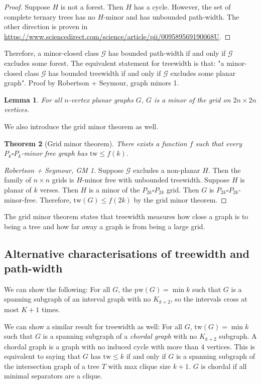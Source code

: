\documentclass[]{article}
\newcommand{\tw}{\text{tw}}
\newcommand{\pw}{\text{pw}}
\newtheorem{theorem}{Theorem}
\newtheorem{lemma}[theorem]{Lemma}
\theoremstyle{definition}
\numberwithin{theorem}{section}
\numberwithin{equation}{section}
\begin{document}
\begin{proof}
	Suppose $H$ is not a forest. Then $H$ has a cycle. However, the set of complete ternary trees has no $H$-minor and has unbounded path-width. The other direction is proven in \url{https://www.sciencedirect.com/science/article/pii/009589569190068U}. 
\end{proof}

Therefore, a minor-closed class $\mathcal{G}$ has bounded path-width if and only if $\mathcal{G}$ excludes some forest. The equivalent statement for treewidth is that: 
"a minor-closed class $\mathcal{G}$ has bounded treewidth if and only if $\mathcal{G}$ excludes some planar graph". Proof by Robertson + Seymour, graph minors 1.
\begin{lemma}
	For all $n$-vertex planar graphs $G$, $G$ is a minor of the grid on $2n \times 2n$ vertices.
\end{lemma}
We also introduce the grid minor theorem as well.
\begin{theorem}[Grid minor theorem]
	There exists a function $f$ such that every $P_k \square P_k$-minor free graph has $\tw \leq f(k)$. 
\end{theorem}
\begin{proof}[Robertson + Seymour, GM 1]
	Suppose $\mathcal{G}$ excludes a non-planar $H$. Then the family of $n \times n$ grids is $H$-minor free with unbounded treewidth.
	Suppose $H$ is planar of $k$ verses. Then $H$ is a minor of the $P_{2k} \square P_{2k}$ grid. Then $G$ is $P_{2k} \square P_{2k}$-minor-free. Therefore, $\tw(G) \leq f(2k)$ by the grid minor theorem. 
\end{proof}

The grid minor theorem states that treewidth measures how close a graph is to being a tree and how far away a graph is from being a large grid. 
\subsection{Alternative characterisations of treewidth and path-width}
We can show the following:
For all $G$, the $\pw(G) = \min k$ such that $G$ is a spanning subgraph of an interval graph with no $K_{k + 2}$, so the intervals cross at most $K + 1$ times. 

We can show a similar result for treewidth as well:
For all $G$, $\tw(G) = \min k$ such that $G$ is a spanning subgraph of a \textit{chordal graph} with no $K_{k + 2}$ subgraph. A chordal graph is a graph with no induced cycle with more than 4 vertices. This is equivalent to saying that $G$ has $\tw \leq k$ if and only if $G$ is a spanning subgraph of the intersection graph of a tree $T$ with max clique size $k + 1$. 
$G$ is chordal if all minimal separators are a clique. 
\end{document}
